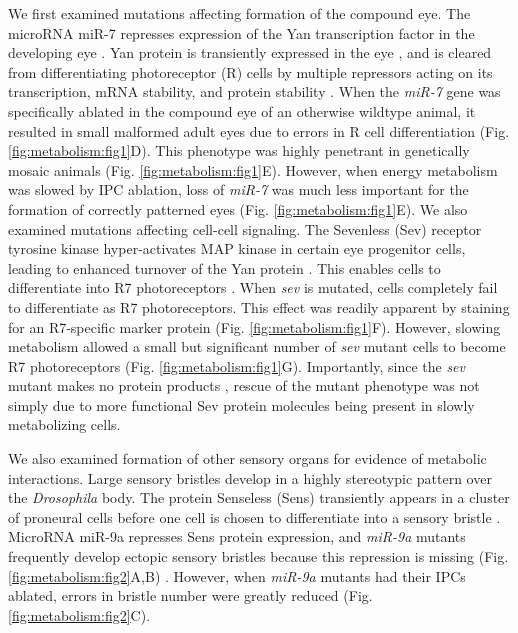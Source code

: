 We first examined mutations affecting formation of the compound eye. The microRNA miR-7 represses expression of the Yan transcription factor in the developing eye \cite{Li2005}. Yan protein is transiently expressed in the eye \cite{Pelaez2015a}, and is cleared from differentiating photoreceptor (R) cells by multiple repressors acting on its transcription, mRNA stability, and protein stability \cite{Graham2010}. When the \textit{miR-7} gene was specifically ablated in the compound eye of an otherwise wildtype animal, it resulted in small malformed adult eyes due to errors in R cell differentiation (Fig. \ref{fig:metabolism:fig1}D). This phenotype was highly penetrant in genetically mosaic animals (Fig. \ref{fig:metabolism:fig1}E). However, when energy metabolism was slowed by IPC ablation, loss of \textit{miR-7} was much less important for the formation of correctly patterned eyes (Fig. \ref{fig:metabolism:fig1}E). We also examined mutations affecting cell-cell signaling. The Sevenless (Sev) receptor tyrosine kinase hyper-activates MAP kinase in certain eye progenitor cells, leading to enhanced turnover of the Yan protein \cite{Rebay1995}. This enables cells to differentiate into R7 photoreceptors \cite{Voas2004}. When \textit{sev} is mutated, cells completely fail to differentiate as R7 photoreceptors. This effect was readily apparent by staining for an R7-specific marker protein (Fig. \ref{fig:metabolism:fig1}F). However, slowing metabolism allowed a small but significant number of \textit{sev} mutant cells to become R7 photoreceptors (Fig. \ref{fig:metabolism:fig1}G). Importantly, since the \textit{sev} mutant makes no protein products \cite{Banerjee1987}, rescue of the mutant phenotype was not simply due to more functional Sev protein molecules being present in slowly metabolizing cells.

We also examined formation of other sensory organs for evidence of metabolic interactions. Large sensory bristles develop in a highly stereotypic pattern over the \textit{Drosophila} body. The protein Senseless (Sens) transiently appears in a cluster of proneural cells before one cell is chosen to differentiate into a sensory bristle \cite{JafarNejad2003}. MicroRNA miR-9a represses Sens protein expression, and \textit{miR-9a} mutants frequently develop ectopic sensory bristles because this repression is missing (Fig. \ref{fig:metabolism:fig2}A,B) \cite{Cassidy2013,Li2006}. However, when \textit{miR-9a} mutants had their IPCs ablated, errors in bristle number were greatly reduced (Fig. \ref{fig:metabolism:fig2}C).

